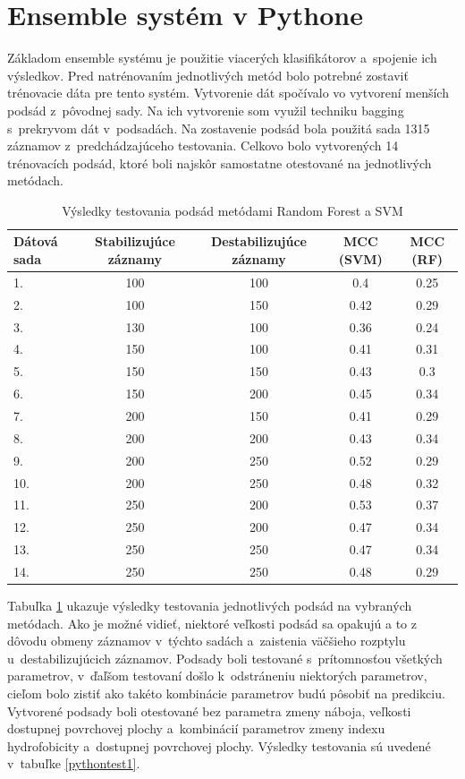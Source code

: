 \newpage
\section{Ensemble systém v Pythone}

Základom ensemble systému je použitie viacerých klasifikátorov a~spojenie ich výsledkov. Pred natrénovaním jednotlivých metód bolo potrebné zostaviť trénovacie dáta pre tento systém. Vytvorenie dát spočívalo vo vytvorení menších podsád z~pôvodnej sady. Na ich vytvorenie som využil techniku bagging s~prekryvom dát v~podsadách. Na zostavenie podsád bola použitá sada 1315 záznamov z~predchádzajúceho testovania. Celkovo bolo vytvorených 14 trénovacích podsád, ktoré boli najskôr samostatne otestované na jednotlivých metódach. 
  
\begin{table}[H]
	\centering
	\begin{tabular}{ |l | c | c | c | c|}
		\hline 
		Dátová sada & Stabilizujúce záznamy & Destabilizujúce záznamy & MCC (SVM) & MCC (RF)  \\ \hline
	1. & 100 & 100 & 0.4 & 0.25\\ \hline
	2. & 100 & 150 & 0.42 & 0.29\\ \hline
	3. & 130 & 100 & 0.36 & 0.24\\ \hline
	4. & 150 & 100 & 0.41 & 0.31\\ \hline
	5. & 150 & 150 & 0.43 & 0.3\\ \hline
	6. & 150 & 200 & 0.45 & 0.34\\ \hline
	7. & 200 & 150 & 0.41 & 0.29\\ \hline
	8. & 200 & 200 & 0.43 & 0.34\\ \hline
	9. & 200 & 250 & 0.52 & 0.29\\ \hline
	10. & 200 & 250 & 0.48 & 0.32\\ \hline
	11. & 250 & 200 & 0.53 & 0.37\\ \hline
	12. & 250 & 200 & 0.47 & 0.34\\ \hline
	13. & 250 & 250 & 0.47 & 0.34\\ \hline
	14. & 250 & 250 & 0.48 & 0.29\\ \hline
	\end{tabular}
	\caption {Výsledky testovania podsád metódami Random Forest a SVM} \label{pythontest} 
\end{table}

Tabuľka \ref{pythontest} ukazuje výsledky testovania jednotlivých podsád na vybraných metódach. Ako je možné vidieť, niektoré veľkosti podsád sa opakujú a to z dôvodu obmeny záznamov v~týchto sadách a~zaistenia väčšieho rozptylu u~destabilizujúcich záznamov. Podsady boli testované s~prítomnosťou všetkých parametrov, v~ďaľšom testovaní došlo k~odstráneniu niektorých parametrov, cieľom bolo zistiť ako takéto kombinácie parametrov budú pôsobiť na predikciu. Vytvorené podsady boli otestované bez parametra zmeny náboja, veľkosti dostupnej povrchovej plochy a~kombinácií parametrov zmeny indexu hydrofobicity a~dostupnej povrchovej plochy. Výsledky testovania sú uvedené v~tabuľke \ref{pythontest1}.

